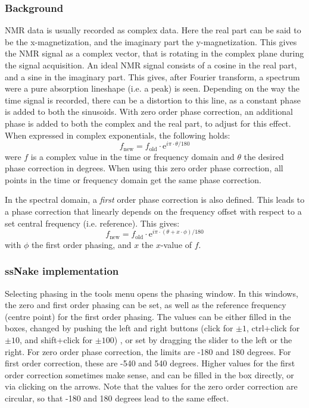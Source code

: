 \documentclass[11pt,a4paper]{article}
\begin{document}
\subsubsection*{Background}
NMR data is usually recorded as complex data. Here the real part can be said to be the x-magnetization, and
the imaginary part the y-magnetization. This gives the NMR signal as a complex vector, that is rotating in the
complex plane during the signal acquisition. An ideal NMR signal consists of a cosine in the real part, and a
sine in the imaginary part. This gives, after Fourier transform, a spectrum were a pure absorption lineshape
(i.e. a peak) is seen. Depending on the way the time signal is recorded, there can be a distortion to this
line, as a constant phase is added to both the sinusoids. With zero order phase correction, an additional
phase is added to both the complex and the real part, to adjust for this effect. When expressed in complex
exponentials, the following holds:
\begin{equation}
f_\text{new} = f_\text{old}\cdot\text{e}^{i\pi\cdot\theta/180} 
\end{equation}
were $f$ is a complex value in the time or frequency domain and $\theta$ the desired phase correction in
degrees. When using this zero order phase correction, all points in the time or frequency domain get the same
phase correction.

In the spectral domain, a \textit{first} order phase correction is also defined. This leads to a phase
correction that linearly depends on the frequency offset with respect to a set central frequency (i.e.
reference). This gives:
\begin{equation}
  f_\text{new} = f_\text{old}\cdot\text{e}^{i\pi\cdot(\theta + x\cdot \phi)/180} 
\end{equation}
with $\phi$ the first order phasing, and $x$ the $x$-value of $f$.


\subsubsection*{ssNake implementation}
Selecting phasing in the tools menu opens the phasing window. In this windows, the zero and first order
phasing can be set, as well as the reference frequency (centre point) for the first order phasing. The values
can be either filled in the boxes,  changed by pushing the left and right buttons (click for $\pm1$,
ctrl+click for $\pm10$, and shift+click for $\pm100$) , or set by dragging the
slider to the left or the right. For zero order phase correction, the limits are -180 and 180 degrees. For
first order correction, these are -540 and 540 degrees. Higher values for the first order correction sometimes
make sense, and can be filled in the box directly, or via clicking on the arrows. Note that the values for the
zero order correction are circular, so that -180 and 180 degrees lead to the same effect.
\end{document}
